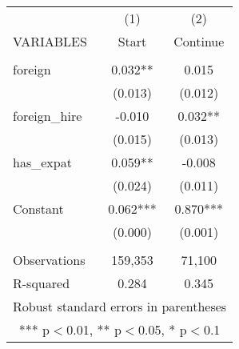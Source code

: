 \begin{tabular}{lcc} \hline
 & (1) & (2) \\
VARIABLES & Start & Continue \\ \hline
 &  &  \\
foreign & 0.032** & 0.015 \\
 & (0.013) & (0.012) \\
foreign\_hire & -0.010 & 0.032** \\
 & (0.015) & (0.013) \\
has\_expat & 0.059** & -0.008 \\
 & (0.024) & (0.011) \\
Constant & 0.062*** & 0.870*** \\
 & (0.000) & (0.001) \\
 &  &  \\
Observations & 159,353 & 71,100 \\
 R-squared & 0.284 & 0.345 \\ \hline
\multicolumn{3}{c}{ Robust standard errors in parentheses} \\
\multicolumn{3}{c}{ *** p$<$0.01, ** p$<$0.05, * p$<$0.1} \\
\end{tabular}